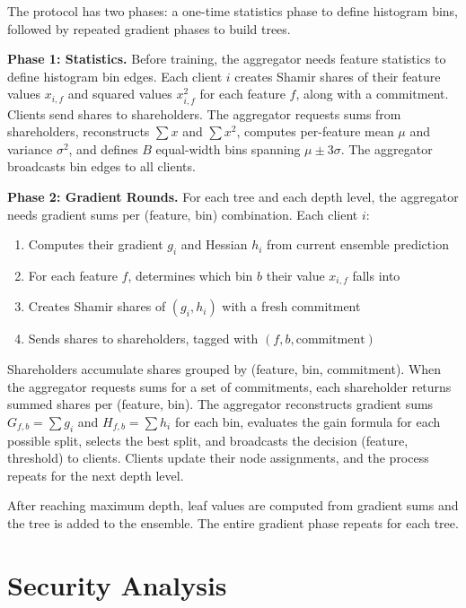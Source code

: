 \documentclass[journal,10pt]{IEEEtran}
\begin{document}
The protocol has two phases: a one-time statistics phase to define histogram bins, followed by repeated gradient phases to build trees.

\textbf{Phase 1: Statistics.} Before training, the aggregator needs feature statistics to define histogram bin edges. Each client $i$ creates Shamir shares of their feature values $x_{i,f}$ and squared values $x_{i,f}^2$ for each feature $f$, along with a commitment. Clients send shares to shareholders. The aggregator requests sums from shareholders, reconstructs $\sum x$ and $\sum x^2$, computes per-feature mean $\mu$ and variance $\sigma^2$, and defines $B$ equal-width bins spanning $\mu \pm 3\sigma$. The aggregator broadcasts bin edges to all clients.

\textbf{Phase 2: Gradient Rounds.} For each tree and each depth level, the aggregator needs gradient sums per (feature, bin) combination. Each client $i$:

\begin{enumerate}
  \item Computes their gradient $g_i$ and Hessian $h_i$ from current ensemble prediction
  \item For each feature $f$, determines which bin $b$ their value $x_{i,f}$ falls into
  \item Creates Shamir shares of $(g_i, h_i)$ with a fresh commitment
  \item Sends shares to shareholders, tagged with $(f, b, \text{commitment})$
\end{enumerate}

Shareholders accumulate shares grouped by (feature, bin, commitment). When the aggregator requests sums for a set of commitments, each shareholder returns summed shares per (feature, bin). The aggregator reconstructs gradient sums $G_{f,b} = \sum g_i$ and $H_{f,b} = \sum h_i$ for each bin, evaluates the gain formula for each possible split, selects the best split, and broadcasts the decision (feature, threshold) to clients. Clients update their node assignments, and the process repeats for the next depth level.

After reaching maximum depth, leaf values are computed from gradient sums and the tree is added to the ensemble. The entire gradient phase repeats for each tree.

\section{Security Analysis}
\end{document}

